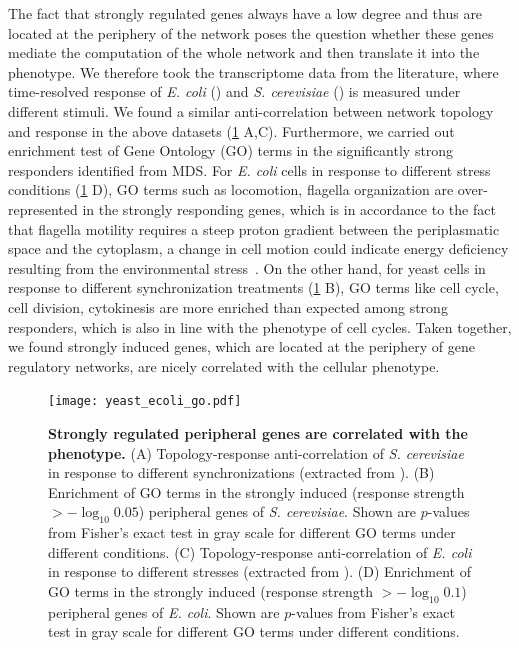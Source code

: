 The fact that strongly regulated genes always have a low degree and thus are
located at the periphery of the network poses the question whether these genes
mediate the computation of the whole network and then translate it into the 
phenotype. We therefore took the transcriptome data from the literature,
where time-resolved response of \emph{E. coli} (\citealp{Jozefczuk2010}) and 
\emph{S. cerevisiae} (\citealp{Spellman1998,Cho1998}) is 
measured under different stimuli. We found a similar anti-correlation between
network topology and response in the above datasets (\ref{fig:ecoli_yeast_go} A,C). Furthermore, we
carried out enrichment test of Gene Ontology (GO) terms in the significantly 
strong responders identified from MDS. 
For \emph{E. coli} cells in response
to different stress conditions (\ref{fig:ecoli_yeast_go} D), GO terms such as 
locomotion, flagella organization
are over-represented in the strongly responding genes, which is in accordance
to the fact that flagella motility requires a steep proton gradient between 
the periplasmatic space and the cytoplasm, a change in cell motion could 
indicate energy deficiency resulting from the environmental stress~\citep{Jozefczuk2010}. 
On the other hand, for yeast cells in response to different synchronization
treatments (\ref{fig:ecoli_yeast_go} B), GO terms like cell cycle, cell division, cytokinesis are more 
enriched than expected among strong responders, which is also in line with the
phenotype of cell cycles. Taken together, we found strongly induced genes, 
which are located at the periphery of gene regulatory networks, are nicely
correlated with the cellular phenotype.


\begin{figure}[!ht]
\begin{center}
\texttt{[image: yeast\_ecoli\_go.pdf]}
\end{center}
\caption[GO term enrichment of strongly regulated genes]{
{\bf Strongly regulated peripheral genes are correlated with the phenotype.}
(A) Topology-response
anti-correlation of \emph{S. cerevisiae} in response to different synchronizations
(extracted from \citealp{Spellman1998,Cho1998}). 
(B) Enrichment of GO
terms in the strongly induced (response strength $> -\log_{10}0.05$) 
peripheral genes of \emph{S. cerevisiae}. Shown 
are $p$-values
from Fisher's exact test in gray scale for different GO terms under different 
conditions.
(C) Topology-response anti-correlation of \emph{E. coli} in response 
to different stresses (extracted from \citealp{Jozefczuk2010}). 
(D) Enrichment of GO terms
in the strongly induced (response strength $> -\log_{10}0.1$) 
peripheral genes of \emph{E. coli}. Shown are $p$-values
from Fisher's exact test in gray scale for different GO terms under different 
conditions. 
}
\label{fig:ecoli_yeast_go}
\end{figure}

